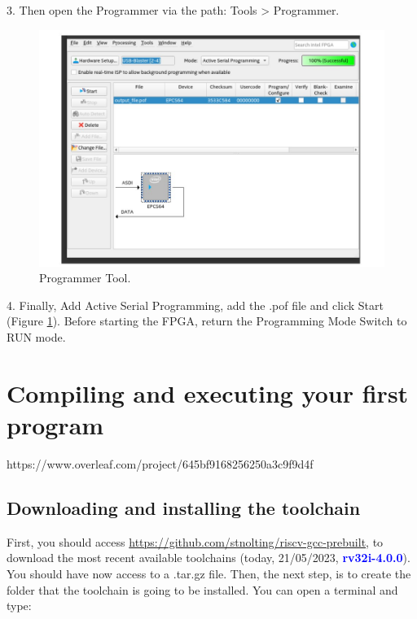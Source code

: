         3. Then open the Programmer via the path: Tools > Programmer.
            
            \begin{figure}[!ht]
                \begin{center}
                    \includegraphics[width= 1\textwidth]{figures/chap2/fpga3.jpg}
                    \caption{\label{f3} Programmer Tool.}
                \end{center}
            \end{figure}
        
        4. Finally, Add Active Serial Programming, add the .pof file and click Start (Figure \ref{f3}). Before starting the FPGA, return the Programming Mode Switch to RUN mode.
        

\chapter{Compiling and executing your first program}
    https://www.overleaf.com/project/645bf9168256250a3c9f9d4f
    \section{Downloading and installing the toolchain}
    
        First, you should access \url{https://github.com/stnolting/riscv-gcc-prebuilt}, to download the most recent available toolchains (today, 21/05/2023, \textcolor{blue}{\textbf{rv32i-4.0.0}}). You should have now access to a .tar.gz file. Then, the next step, is to create the folder that the toolchain is going to be installed. You can open a terminal and type:
        
